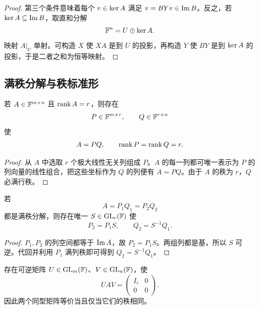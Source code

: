 \begin{proof}
第三个条件意味着每个 $v\in\operatorname{ker} A$ 满足 $v=BYv\in\operatorname{Im} B$。反之，若 $\operatorname{ker} A\subseteq\operatorname{Im} B$，取直和分解
\begin{equation}
 \mathbb F^n=U\oplus\operatorname{ker} A.
\end{equation}
映射 $A|_U$ 单射。可构造 $X$ 使 $XA$ 是到 $U$ 的投影，再构造 $Y$ 使 $BY$ 是到 $\operatorname{ker} A$ 的投影，于是二者之和为恒等映射。
\end{proof}

\subsection{满秩分解与秩标准形}

\begin{theorem}[满秩分解]
若 $A\in\mathbb F^{m\times n}$ 且 $\operatorname{rank} A=r$，则存在
\begin{equation}
 P\in\mathbb F^{m\times r},
 \qquad
 Q\in\mathbb F^{r\times n}
\end{equation}
使
\begin{equation}
 A=PQ,
 \qquad
 \operatorname{rank} P=\operatorname{rank} Q=r.
\end{equation}
\end{theorem}

\begin{proof}
从 $A$ 中选取 $r$ 个极大线性无关列组成 $P$。$A$ 的每一列都可唯一表示为 $P$ 的列向量的线性组合，把这些坐标作为 $Q$ 的列便有 $A=PQ$。由于 $A$ 的秩为 $r$，$Q$ 必满行秩。
\end{proof}

\begin{proposition}[满秩分解的唯一性]
若
\begin{equation}
 A=P_1Q_1=P_2Q_2
\end{equation}
都是满秩分解，则存在唯一 $S\in\operatorname{GL}_r(\mathbb F)$ 使
\begin{equation}
 P_2=P_1S,
 \qquad
 Q_2=S^{-1}Q_1.
\end{equation}
\end{proposition}

\begin{proof}
$P_1,P_2$ 的列空间都等于 $\operatorname{Im} A$，故 $P_2=P_1S$。两组列都是基，所以 $S$ 可逆。代回并利用 $P_1$ 满列秩即可得到 $Q_2=S^{-1}Q_1$。
\end{proof}

\begin{corollary}[秩标准形]
存在可逆矩阵 $U\in\operatorname{GL}_m(\mathbb F)$、$V\in\operatorname{GL}_n(\mathbb F)$，使
\begin{equation}
 UAV=\begin{pmatrix}
 I_r&0\\
 0&0
 \end{pmatrix}.
\end{equation}
因此两个同型矩阵等价当且仅当它们的秩相同。
\end{corollary}

